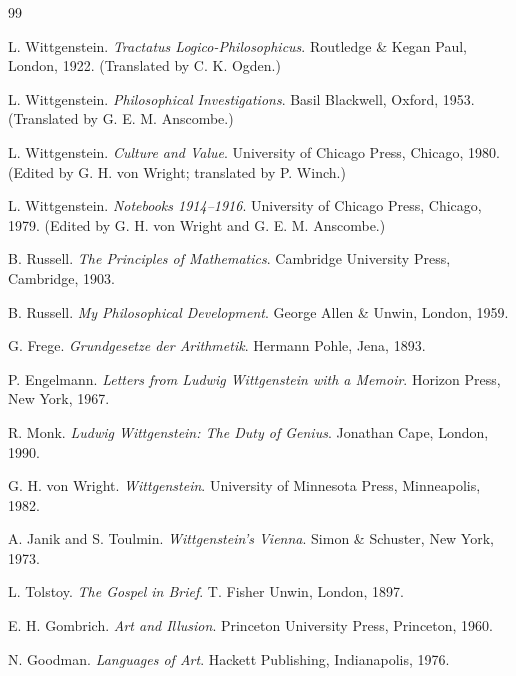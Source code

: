 \documentclass[11pt]{article}
\begin{document}
\newpage
\begin{thebibliography}{99}

L. Wittgenstein.
\newblock \emph{Tractatus Logico-Philosophicus}.
\newblock Routledge \& Kegan Paul, London, 1922.
\newblock (Translated by C. K. Ogden.)

L. Wittgenstein.
\newblock \emph{Philosophical Investigations}.
\newblock Basil Blackwell, Oxford, 1953.
\newblock (Translated by G. E. M. Anscombe.)

L. Wittgenstein.
\newblock \emph{Culture and Value}.
\newblock University of Chicago Press, Chicago, 1980.
\newblock (Edited by G. H. von Wright; translated by P. Winch.)

L. Wittgenstein.
\newblock \emph{Notebooks 1914--1916}.
\newblock University of Chicago Press, Chicago, 1979.
\newblock (Edited by G. H. von Wright and G. E. M. Anscombe.)

B. Russell.
\newblock \emph{The Principles of Mathematics}.
\newblock Cambridge University Press, Cambridge, 1903.

B. Russell.
\newblock \emph{My Philosophical Development}.
\newblock George Allen \& Unwin, London, 1959.

G. Frege.
\newblock \emph{Grundgesetze der Arithmetik}.
\newblock Hermann Pohle, Jena, 1893.

P. Engelmann.
\newblock \emph{Letters from Ludwig Wittgenstein with a Memoir}.
\newblock Horizon Press, New York, 1967.

R. Monk.
\newblock \emph{Ludwig Wittgenstein: The Duty of Genius}.
\newblock Jonathan Cape, London, 1990.

G. H. von Wright.
\newblock \emph{Wittgenstein}.
\newblock University of Minnesota Press, Minneapolis, 1982.

A. Janik and S. Toulmin.
\newblock \emph{Wittgenstein's Vienna}.
\newblock Simon \& Schuster, New York, 1973.

L. Tolstoy.
\newblock \emph{The Gospel in Brief}.
\newblock T. Fisher Unwin, London, 1897.

E. H. Gombrich.
\newblock \emph{Art and Illusion}.
\newblock Princeton University Press, Princeton, 1960.

N. Goodman.
\newblock \emph{Languages of Art}.
\newblock Hackett Publishing, Indianapolis, 1976.


\end{thebibliography}
\end{document}
